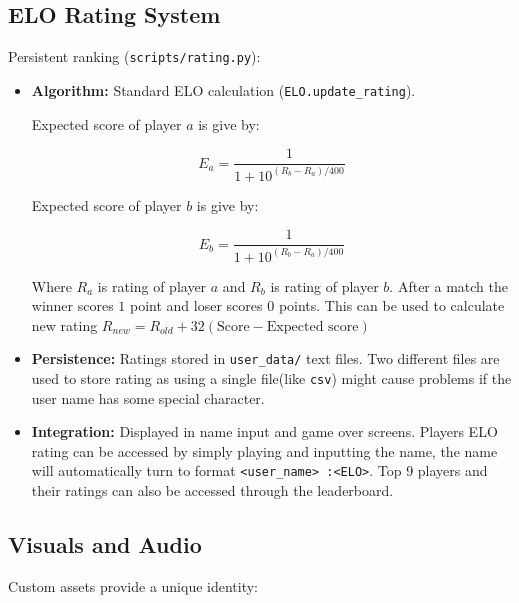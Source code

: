 \documentclass[11pt, a4paper]{article}
\begin{document}
\vspace{1cm}

\subsection{ELO Rating System}

Persistent ranking (\texttt{scripts/rating.py}):

\begin{itemize}

    \item \textbf{Algorithm:} Standard ELO calculation (\texttt{ELO.update\_rating}).

    Expected score of player $a$ is give by:

    \[E_a = \frac{1}{1+10^{(R_b-R_a)/400}}\]

    Expected score of player $b$ is give by:

    \[E_b = \frac{1}{1+10^{(R_b-R_a)/400}}\]

    Where $R_a$ is rating of player $a$ and $R_b$ is rating of player $b$.
    After a match the winner scores $1$ point and loser scores $0$ points.
    This can be used to calculate new rating $R_{new} = R_{old} + 32(\text{Score}-\text{Expected score})$
    
    \item \textbf{Persistence:} Ratings stored in \texttt{user\_data/} text files. Two different files are used to store rating as using a single file(like \texttt{csv}) might cause problems if the user name has some special character.
    
    \item \textbf{Integration:} Displayed in name input and game over screens. Players ELO rating can be accessed by simply playing and inputting the name, the name will automatically turn to format \texttt{<user\_name> :<ELO>}. Top 9 players and their ratings can also be accessed through the leaderboard.

\end{itemize}

\vspace{1cm}

\subsection{Visuals and Audio}

Custom assets provide a unique identity:
\end{document}
